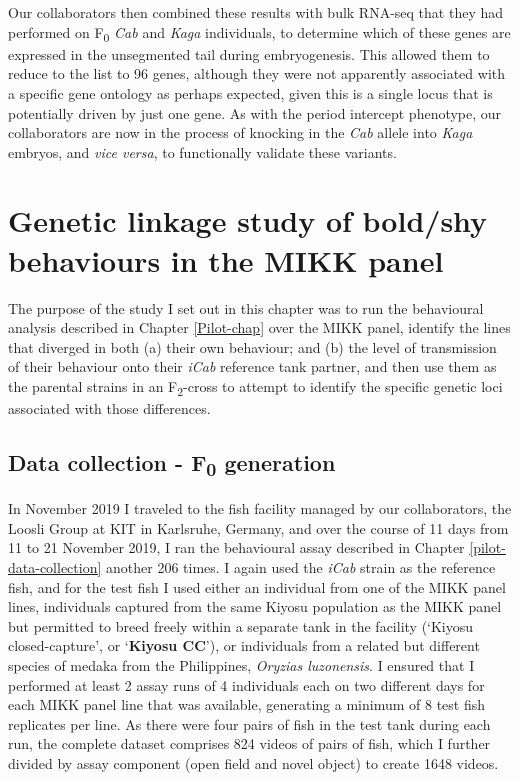 \documentclass[
]{book}
\begin{document}
Our collaborators then combined these results with bulk RNA-seq that they had performed on F\textsubscript{0} \emph{Cab} and \emph{Kaga} individuals, to determine which of these genes are expressed in the unsegmented tail during embryogenesis. This allowed them to reduce to the list to 96 genes, although they were not apparently associated with a specific gene ontology as perhaps expected, given this is a single locus that is potentially driven by just one gene. As with the period intercept phenotype, our collaborators are now in the process of knocking in the \emph{Cab} allele into \emph{Kaga} embryos, and \emph{vice versa}, to functionally validate these variants.

\hypertarget{MIKK-F2-chap}{%
\chapter{Genetic linkage study of bold/shy behaviours in the MIKK panel}\label{MIKK-F2-chap}}


The purpose of the study I set out in this chapter was to run the behavioural analysis described in Chapter \ref{Pilot-chap} over the MIKK panel, identify the lines that diverged in both (a) their own behaviour; and (b) the level of transmission of their behaviour onto their \emph{\textcolor{iCab_424B4D}{iCab}} reference tank partner, and then use them as the parental strains in an F\textsubscript{2}-cross to attempt to identify the specific genetic loci associated with those differences.

\hypertarget{data-collection---f0-generation}{%
\section{\texorpdfstring{Data collection - F\textsubscript{0} generation}{Data collection - F0 generation}}\label{data-collection---f0-generation}}

In November 2019 I traveled to the fish facility managed by our collaborators, the Loosli Group at KIT in Karlsruhe, Germany, and over the course of 11 days from 11 to 21 November 2019, I ran the behavioural assay described in Chapter \ref{pilot-data-collection} another 206 times. I again used the \emph{\textcolor{iCab_424B4D}{iCab}} strain as the reference fish, and for the test fish I used either an individual from one of the MIKK panel lines, individuals captured from the same Kiyosu population as the MIKK panel but permitted to breed freely within a separate tank in the facility (`Kiyosu closed-capture', or `\textbf{Kiyosu CC}'), or individuals from a related but different species of medaka from the Philippines, \emph{Oryzias luzonensis}. I ensured that I performed at least 2 assay runs of 4 individuals each on two different days for each MIKK panel line that was available, generating a minimum of 8 test fish replicates per line. As there were four pairs of fish in the test tank during each run, the complete dataset comprises 824 videos of pairs of fish, which I further divided by assay component (open field and novel object) to create 1648 videos.
\end{document}
